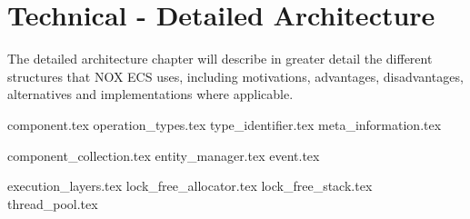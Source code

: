 \chapter{Technical - Detailed Architecture}
\label{chap:technical_detailed_architecture}
The detailed architecture chapter will describe in greater detail the different structures that NOX ECS uses, including motivations, advantages, disadvantages, alternatives and implementations where applicable.

{component.tex}
{operation_types.tex}
{type_identifier.tex}
{meta_information.tex}

{component_collection.tex}
{entity_manager.tex}
{event.tex}

{execution_layers.tex}
{lock_free_allocator.tex}
{lock_free_stack.tex}
{thread_pool.tex}

